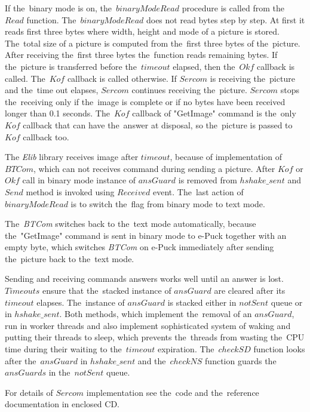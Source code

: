   If the~binary mode is on, the~$binaryModeRead$ procedure is called from
  the~$Read$ function. The~$binaryModeRead$ does not read bytes step by step.
  At first it reads first three bytes where width, height and mode of a picture is stored.
  The~total size of a picture is computed from the~first three bytes of the~picture.
  After receiving the~first three bytes the~function reads remaining bytes.
  If the~picture is transferred before the~$timeout$ elapsed, then the~$Okf$ callback is called.
  The~$Kof$ callback is called otherwise. 
  If $Sercom$ is receiving the~picture and the~time out elapses,
  $Sercom$ continues receiving the~picture. $Sercom$ stops the~receiving only if
  the~image is complete or if no bytes have been received longer than 0.1 seconds.
  The~$Kof$ callback of "GetImage" command is the~only $Kof$ callback 
  that can have the~answer at disposal, so the~picture is passed to $Kof$ callback too.	

  The {\it Elib} library receives image after $timeout$, because of implementation of~ $BTCom$,
  which can not receives command during sending a picture.
  After $Kof$ or $Okf$ call in binary mode instance of $ansGuard$ is removed from $hshake\_sent$ 
  and $Send$ method is invoked using $Received$ event.
  The~last action of $binaryModeRead$ is to switch the~flag from binary mode to text mode.
 
  \begin{remark}
  The~{\it BTCom} switches back to the~text mode automatically, because
  the~"GetImage" command is sent in binary mode to e-Puck together with an empty byte, which
  switches {\it BTCom} on e-Puck  immediately after sending the~picture back to the~text mode.
  \end{remark}

  Sending and receiving commands answers works well 
  until an answer is lost. $Timeouts$ ensure that the~stacked instance of $ansGuard$ are cleared after its $timeout$  elapses.
  The~instance of $ansGuard$ is stacked either in $notSent$ queue or in $hshake\_sent$.
  Both methods, which implement the~removal of an $ansGuard$, run in worker threads and also implement
  sophisticated system of waking and putting their threads to sleep, which prevents the~threads from wasting
  the~CPU time during their waiting to the~$timeout$ expiration. 
  The~$checkSD$ function looks after the~$ansGuard$ in $hshake\_sent$ and the~$checkNS$ function guards
  the~$ansGuards$ in the~$notSent$ queue.

  \begin{remark}
  For details of $Sercom$ implementation see the~code 
  and the~reference documentation in enclosed CD.
  \end{remark}
  

